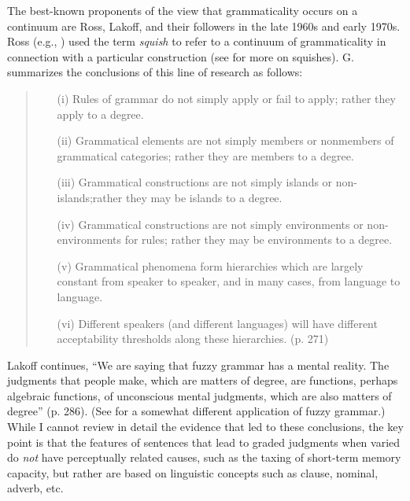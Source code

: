 The  best-known proponents of the view that grammaticality occurs on a continuum are Ross, Lakoff, and their followers in the late 1960s and early 1970s. Ross (e.g., \citeyear{Ross1972}) used the term \textit{squish} to refer to a continuum of grammaticality in connection with a particular construction (see \citet{HindleEtAl1975} for more on squishes). G. \citet{Lakoff1973} summarizes the conclusions of this line of research as follows:

\begin{quote} 
\begin{itemize}
\item[(i)] Rules of grammar do not simply apply or fail to apply; rather they apply to a degree.
 
\item[(ii)] Grammatical elements are not simply members or nonmembers of grammatical categories; rather they are members to a degree.

\item[(iii)] Grammatical constructions are not simply islands or non-is\-lands;\linebreak rather they may be islands to a degree.

\item[(iv)] Grammatical constructions are not simply environments or non-envi\-ron\-ments for rules; rather they may be environments to a degree.

\item[(v)] Grammatical phenomena form hierarchies which are largely constant from speaker to speaker, and in many cases, from language to language.

\item[(vi)] Different speakers (and different languages) will have different acceptability thresholds along these hierarchies.  (p. 271)

\end{itemize}
\end{quote}

\noindent
Lakoff continues, ``We are saying that fuzzy grammar has a mental reality. The judgments that people make, which are matters of degree, are functions, perhaps algebraic functions, of unconscious mental judgments, which are also matters of degree'' (p. 286). (See \citet{LeveltEtAl1977} for a somewhat different application of fuzzy grammar.) While I cannot review in detail the evidence that led to these conclusions, the key point is that the features of sentences that lead to graded judgments when varied do \textit{not} have perceptually related causes, such as the taxing of short-term memory capacity, but rather are based on linguistic concepts such as clause, nominal, adverb, etc.


